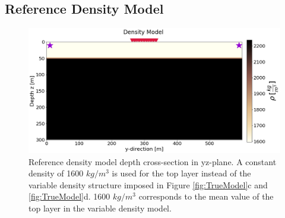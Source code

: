 \documentclass{article} %
\begin{document}
	\newpage

	\subsection{Reference Density Model} \label{sec:AppendixB}
	\renewcommand{\thefigure}{B\arabic{figure}}
	\setcounter{figure}{0} 
	\begin{figure}[H]
		\centering
		\includegraphics[width =0.65\linewidth]{../Figures/rho_constant.png}
		\captionsetup{width=\linewidth}
		\caption{Reference density model depth cross-section in yz-plane. A constant density of 1600 $kg/m^{3}$ is used for the top layer instead of the variable density structure imposed in Figure \ref{fig:TrueModel}c and \ref{fig:TrueModel}d. 1600 $kg/m^{3}$ corresponds to the mean value of the top layer in the variable density model.}
		\label{fig:cst_rho}
	\end{figure}\mbox{}
\end{document}
